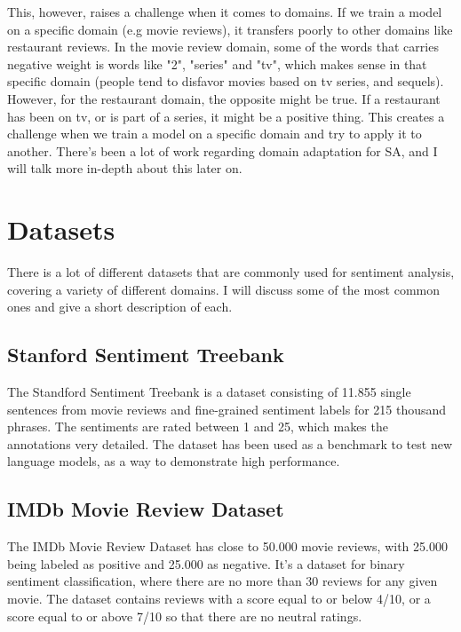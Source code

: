 \documentclass{report}
\begin{document}
This, however, raises a challenge when it comes to domains. If we train a model on a specific domain (e.g movie reviews), it transfers poorly to other domains like restaurant reviews. In the movie review domain, some of the words that carries negative weight is words like "2", "series" and "tv", which makes sense in that specific domain (people tend to disfavor movies based on tv series, and sequels). However, for the restaurant domain, the opposite might be true. If a restaurant has been on tv, or is part of a series, it might be a positive thing. This creates a challenge when we train a model on a specific domain and try to apply it to another. There's been a lot of work regarding domain adaptation for SA, and I will talk more in-depth about this later on.



\section{Datasets}
There is a lot of different datasets that are commonly used for sentiment analysis, covering a variety of different domains. I will discuss some of the most common ones and give a short description of each.
\subsection{Stanford Sentiment Treebank}
The Standford Sentiment Treebank \cite{socher2013recursive} is a dataset consisting of 11.855 single sentences from movie reviews and fine-grained sentiment labels for 215 thousand phrases. The sentiments are rated between 1 and 25, which makes the annotations very detailed. The dataset has been used as a benchmark to test new language models, as a way to demonstrate high performance.
\subsection{IMDb Movie Review Dataset}
The IMDb Movie Review Dataset \cite{maas-EtAl:2011:ACL-HLT2011} has close to 50.000 movie reviews, with 25.000 being labeled as positive and 25.000 as negative. It's a dataset for binary sentiment classification, where there are no more than 30 reviews for any given movie. The dataset contains reviews with a score equal to or below 4/10, or a score equal to or above 7/10 so that there are no neutral ratings.
\end{document}
